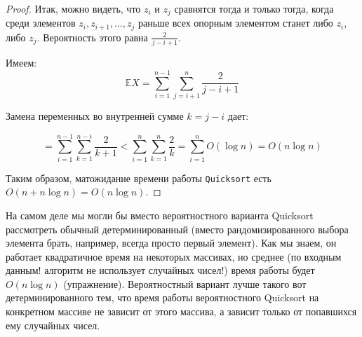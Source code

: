 \begin{proof}
    Итак, можно видеть, что $z_i$ и $z_j$ сравнятся тогда и только тогда, когда среди элементов $z_i, z_{i+1}, \ldots, z_j$ раньше всех опорным элементом станет либо $z_i$, либо $z_j$. Вероятность этого равна $\frac{2}{j-i+1}$.
    
    Имеем: $$\mathbb E X = \sum_{i=1}^{n-1} \sum_{j=i+1}^n \frac{2}{j-i+1}$$
    
    Замена переменных во внутренней сумме $k = j-i$ дает:
    
    $$ = \sum_{i=1}^{n-1} \sum_{k=1}^{n-i} \frac{2}{k+1} < \sum_{i=1}^n \sum_{k=1}^n \frac{2}{k} = \sum_{i=1}^n O(\log n) = O(n \log n)$$
    
    Таким образом, матожидание времени работы \texttt{Quicksort} есть $O(n+n\log n) = O(n\log n)$. 
\end{proof}

На самом деле мы могли бы вместо вероятностного варианта Quicksort рассмотреть обычный детерминированный (вместо рандомизированного выбора элемента брать, например, всегда просто первый элемент). Как мы знаем, он работает квадратичное время на некоторых массивах, но среднее (по входным данным! алгоритм не использует случайных чисел!) время работы будет $O(n\log n)$ (упражнение). Вероятностный вариант лучше такого вот детерминированного тем, что время работы вероятностного Quicksort на конкретном массиве не зависит от этого массива, а зависит только от попавшихся ему случайных чисел.